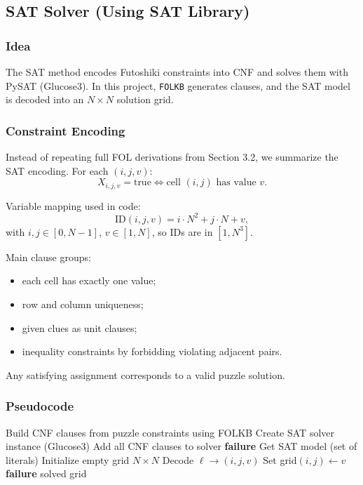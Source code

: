 \subsection{SAT Solver (Using SAT Library)}
\subsubsection{Idea}
The SAT method encodes Futoshiki constraints into CNF and solves them with PySAT (Glucose3). In this project, \texttt{FOLKB} generates clauses, and the SAT model is decoded into an \(N \times N\) solution grid.

\subsubsection{Constraint Encoding}
Instead of repeating full FOL derivations from Section 3.2, we summarize the SAT encoding. For each \((i,j,v)\):
\[
X_{i,j,v} = \text{true} \iff \text{cell }(i,j)\text{ has value }v.
\]

Variable mapping used in code:
\[
\text{ID}(i,j,v)= i\cdot N^2 + j\cdot N + v,
\]
with \(i,j\in[0,N-1]\), \(v\in[1,N]\), so IDs are in \([1,N^3]\).

Main clause groups:
\begin{itemize}
\item each cell has exactly one value;
\item row and column uniqueness;
\item given clues as unit clauses;
\item inequality constraints by forbidding violating adjacent pairs.
\end{itemize}
Any satisfying assignment corresponds to a valid puzzle solution.

\subsubsection{Pseudocode}
\begin{algorithm}[H]
\caption{SAT-based Futoshiki Solver}
\begin{algorithmic}[1]
\State Build CNF clauses from puzzle constraints using FOLKB
\State Create SAT solver instance (Glucose3)
\State Add all CNF clauses to solver
\State \Return \textbf{failure}
\EndIf
\State Get SAT model (set of literals)
\State Initialize empty grid \(N \times N\)
\State Decode \(\ell \rightarrow (i,j,v)\)
\State Set grid\((i,j) \leftarrow v\)
\EndIf
\EndFor
{}
\State \Return \textbf{failure}
\Else
\State \Return solved grid
\EndIf
\end{algorithmic}
\end{algorithm}

